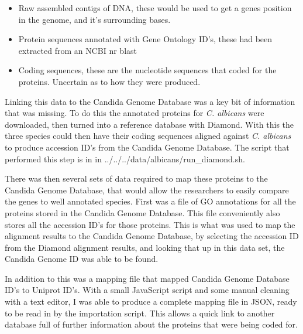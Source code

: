 \begin{itemize}
  \item Raw assembled contigs of DNA, these would be used to get a genes position in the genome, and it's surrounding bases. 
  \item Protein sequences annotated with Gene Ontology ID's, these had been extracted from an NCBI nr blast
  \item Coding sequences, these are the nucleotide sequences that coded for the proteins. Uncertain as to how they were produced.
\end{itemize}

Linking this data to the Candida Genome Database was a key bit of information that was missing. To do this the annotated proteins for \textit{C. albicans}\cite{http://www.candidagenome.org/download/sequence/C_albicans_SC5314/Assembly22/current/C_albicans_SC5314_A22_current_default_protein.fasta.gz} were downloaded, then turned into a reference database with Diamond. With this the three species could then have their coding sequences aligned against \textit{C. albicans} to produce accession ID's from the Candida Genome Database. The script that performed this step is in in ../../../data/albicans/run_diamond.sh.

There was then several sets of data required to map these proteins to the Candida Genome Database, that would allow the researchers to easily compare the genes to well annotated species. First was a file of GO annotations for all the proteins stored in the Candida Genome Database. \cite{http://www.candidagenome.org/download/go/gene_association.cgd.gz} This file conveniently also stores all the accession ID's for those proteins. This is what was used to map the alignment results to the Candida Genome Database, by selecting the accession ID from the Diamond alignment results, and looking that up in this data set, the Candida Genome ID was able to be found.

In addition to this was a mapping file that mapped Candida Genome Database ID's to Uniprot ID's. With a small JavaScript script and some manual cleaning with a text editor, I was able to produce a complete mapping file in JSON, ready to be read in by the importation script. This allows a quick link to another database full of further information about the proteins that were being coded for. 
